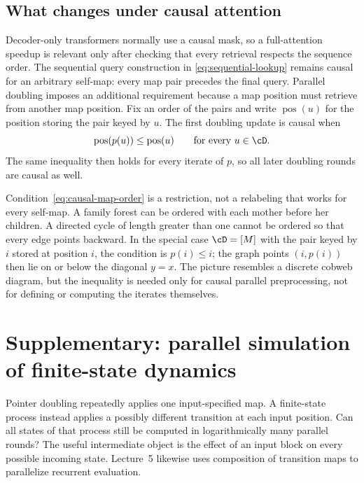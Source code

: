 \documentclass[11pt,twoside]{article}
\theoremstyle{definition}
\theoremstyle{remark}
\begin{document}
\subsection{What changes under causal attention}

Decoder-only transformers normally use a causal mask, so a full-attention
speedup is relevant only after checking that every retrieval respects the
sequence order. The sequential query construction in
\cref{eq:sequential-lookup} remains
causal for an arbitrary self-map: every map pair precedes the final query.
Parallel doubling imposes an additional requirement because a map position
must retrieve from another map position. Fix an order of the pairs and write
$\operatorname{pos}(u)$ for the position storing the pair keyed by $u$. The
first doubling update is causal when
\begin{equation}
 \operatorname{pos}(p(u))\leq\operatorname{pos}(u)
 \qquad\text{for every }u\in\cD.
 \label{eq:causal-map-order}
\end{equation}
The same inequality then holds for every iterate of $p$, so all later
doubling rounds are causal as well.

Condition~\eqref{eq:causal-map-order} is a restriction, not a relabeling that
works for every self-map. A family forest can be ordered with each mother
before her children. A directed cycle of length greater than one
cannot be ordered so that every edge points backward. In the special case
$\cD=[M]$ with the pair keyed by $i$ stored at position $i$, the condition is
$p(i)\leq i$; the graph points $(i,p(i))$ then lie on or below the diagonal
$y=x$. The picture resembles a discrete cobweb diagram, but the inequality is
needed only for causal parallel preprocessing, not for defining or computing
the iterates themselves.

\section{Supplementary: parallel simulation of finite-state dynamics}
\label{sec:automata-scan}

Pointer doubling repeatedly applies one input-specified map. A finite-state
process instead applies a possibly different transition at each input
position. Can all states of that process still be computed in logarithmically
many parallel rounds? The useful intermediate object is the effect of an
input block on every possible incoming state. Lecture~5 likewise uses
composition of transition maps to parallelize recurrent evaluation.
\end{document}
